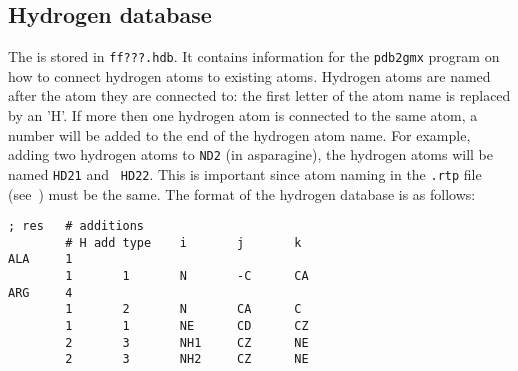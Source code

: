 \subsection{Hydrogen database}
\label{subsec:hdb}
The  is stored in {\tt ff???.hdb}. It
contains information for the {\tt pdb2gmx} program on how to connect
hydrogen atoms to existing atoms. Hydrogen atoms are named after the
atom they are connected to: the first letter of the atom name is
replaced by an 'H'. If more then one hydrogen atom is connected to the
same atom, a number will be added to the end of the hydrogen atom
name. For example, adding two hydrogen atoms to {\tt ND2} (in
asparagine), the hydrogen atoms will be named {\tt HD21} and {\tt
HD22}. This is important since atom naming in the {\tt .rtp} file
(see~) must be the same. The format of the hydrogen
database is as follows:
%
{\small\begin{verbatim}
; res   # additions
        # H add type    i       j       k
ALA     1
        1       1       N       -C      CA
ARG     4
        1       2       N       CA      C
        1       1       NE      CD      CZ
        2       3       NH1     CZ      NE
        2       3       NH2     CZ      NE
\end{verbatim}
}

